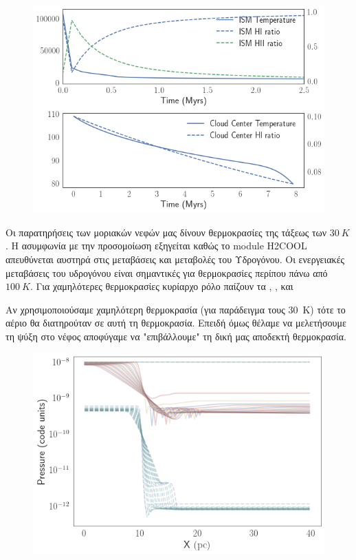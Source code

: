 \begin{figure}
	\centering
	\includegraphics[width=1\linewidth]{DataImages/H2CoolingTMPcenterISM}
	\caption{}
	\label{fig:h2coolingtmpcenterism}
\end{figure}


	Οι παρατηρήσεις των μοριακών νεφών μας δίνουν θερμοκρασίες της τάξεως των $\SI{30}{K}$. Η ασυμφωνία με την προσομοίωση εξηγείται καθώς το module H2COOL απευθύνεται αυστηρά στις μεταβάσεις και μεταβολές του Υδρογόνου. Οι ενεργειακές μεταβάσεις του υδρογόνου είναι σημαντικές για θερμοκρασίες περίπου πάνω από $\SI{100}{K}$. Για χαμηλότερες θερμοκρασίες κυρίαρχο ρόλο παίζουν τα , ,  και 
	
Αν χρησιμοποιούσαμε χαμηλότερη θερμοκρασία (για παράδειγμα τους \SI{30}{K}) τότε το αέριο θα διατηρούταν σε αυτή τη θερμοκρασία. Επειδή όμως θέλαμε να μελετήσουμε τη ψύξη στο νέφος αποφύγαμε να "επιβάλλουμε" τη δική μας αποδεκτή θερμοκρασία.

\begin{figure}[h]
	\centering
	\includegraphics[width=1\linewidth]{DataImages/diffH2CoolSNCoolPRSprofile.png}
	\caption{}
	\label{fig:diffh2coolsncoolprsprofile}
\end{figure}




